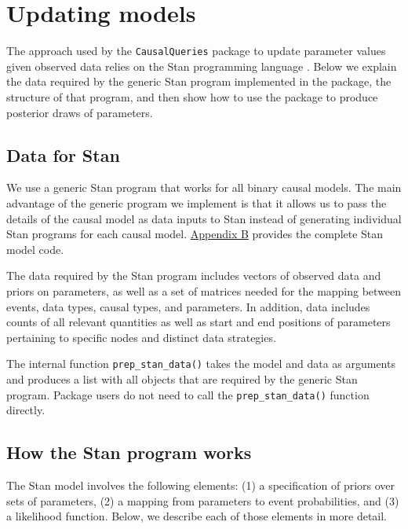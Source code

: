 \documentclass[
  11pt,
  article]{jss}
\begin{document}
\hypertarget{sec-update}{%
\section{Updating models}\label{sec-update}}

The approach used by the \texttt{CausalQueries} package to update
parameter values given observed data relies on the Stan programming
language \citep{carpenter_stan_2017}. Below we explain the data required
by the generic Stan program implemented in the package, the structure of
that program, and then show how to use the package to produce posterior
draws of parameters.

\hypertarget{data-for-stan}{%
\subsection{Data for Stan}\label{data-for-stan}}

We use a generic Stan program that works for all binary causal models.
The main advantage of the generic program we implement is that it allows
us to pass the details of the causal model as data inputs to Stan
instead of generating individual Stan programs for each causal model.
\protect\hyperlink{sec-stancode}{Appendix B} provides the complete Stan
model code.

The data required by the Stan program includes vectors of observed data
and priors on parameters, as well as a set of matrices needed for the
mapping between events, data types, causal types, and parameters. In
addition, data includes counts of all relevant quantities as well as
start and end positions of parameters pertaining to specific nodes and
distinct data strategies.

The internal function \texttt{prep\_stan\_data()} takes the model and
data as arguments and produces a list with all objects that are required
by the generic Stan program. Package users do not need to call the
\texttt{prep\_stan\_data()} function directly.

\hypertarget{how-the-stan-program-works}{%
\subsection{How the Stan program
works}\label{how-the-stan-program-works}}

The Stan model involves the following elements: (1) a specification of
priors over sets of parameters, (2) a mapping from parameters to event
probabilities, and (3) a likelihood function. Below, we describe each of
those elements in more detail.
\end{document}
